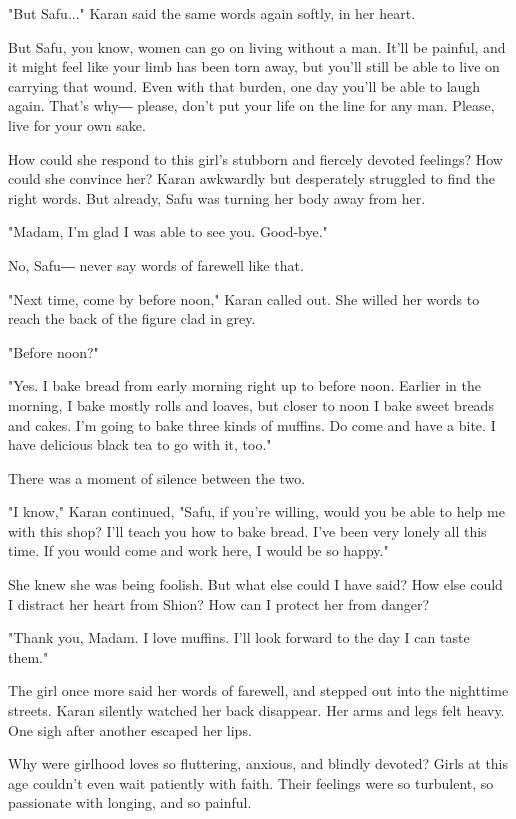 "But Safu..." Karan said the same words again softly, in her heart.

But Safu, you know, women can go on living without a man. It'll be
painful, and it might feel like your limb has been torn away, but you'll
still be able to live on carrying that wound. Even with that burden, one
day you'll be able to laugh again. That's why― please, don't put your
life on the line for any man. Please, live for your own sake.

How could she respond to this girl's stubborn and fiercely devoted
feelings? How could she convince her? Karan awkwardly but desperately
struggled to find the right words. But already, Safu was turning her
body away from her.

"Madam, I'm glad I was able to see you. Good-bye."

No, Safu― never say words of farewell like that.

"Next time, come by before noon," Karan called out. She willed her words
to reach the back of the figure clad in grey.

"Before noon?"

"Yes. I bake bread from early morning right up to before noon. Earlier
in the morning, I bake mostly rolls and loaves, but closer to noon I
bake sweet breads and cakes. I'm going to bake three kinds of muffins.
Do come and have a bite. I have delicious black tea to go with it, too."

There was a moment of silence between the two.

"I know," Karan continued, "Safu, if you're willing, would you be able
to help me with this shop? I'll teach you how to bake bread. I've been
very lonely all this time. If you would come and work here, I would be
so happy."

She knew she was being foolish. But what else could I have said? How
else could I distract her heart from Shion? How can I protect her from
danger?

"Thank you, Madam. I love muffins. I'll look forward to the day I can
taste them."

The girl once more said her words of farewell, and stepped out into the
nighttime streets. Karan silently watched her back disappear. Her arms
and legs felt heavy. One sigh after another escaped her lips.

Why were girlhood loves so fluttering, anxious, and blindly devoted?
Girls at this age couldn't even wait patiently with faith. Their
feelings were so turbulent, so passionate with longing, and so painful.

